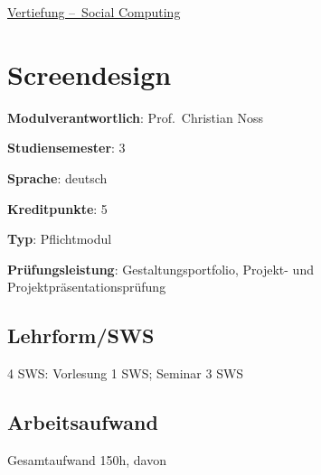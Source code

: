 \hyperref[/mi-2017/modulbeschreibungen-bachelor/BA_Vertiefung_SocialComputing]{Vertiefung – Social Computing}

\hypertarget{screendesignpathlabelmi-2017modulbeschreibungen-bachelorba_screendesign}{%
\chapter{Screendesign\label{/mi-2017/modulbeschreibungen-bachelor/BA_Screendesign}}\label{screendesignpathlabelmi-2017modulbeschreibungen-bachelorba_screendesign}}

\begin{modulHead}
\textbf{Modulverantwortlich}: Prof.~Christian
Noss
\end{modulHead}
\begin{modulHead}
\textbf{Studiensemester}:
3
\end{modulHead}
\begin{modulHead}
\textbf{Sprache}:
deutsch
\end{modulHead}
\begin{modulHead}
\textbf{Kreditpunkte}:
5
\end{modulHead}
\begin{modulHead}
\textbf{Typ}:
Pflichtmodul
\end{modulHead}
\begin{modulHead}
\textbf{Prüfungsleistung}:
Gestaltungsportfolio, Projekt- und
Projektpräsentationsprüfung
\end{modulHead}


\hypertarget{lehrformswspathlabelmi-2017modulbeschreibungen-bachelorba_screendesign}{%
\section*{Lehrform/SWS\label{/mi-2017/modulbeschreibungen-bachelor/BA_Screendesign}}\label{lehrformswspathlabelmi-2017modulbeschreibungen-bachelorba_screendesign}}

4 SWS: Vorlesung 1 SWS; Seminar 3 SWS

\hypertarget{arbeitsaufwandpathlabelmi-2017modulbeschreibungen-bachelorba_screendesign}{%
\section*{Arbeitsaufwand\label{/mi-2017/modulbeschreibungen-bachelor/BA_Screendesign}}\label{arbeitsaufwandpathlabelmi-2017modulbeschreibungen-bachelorba_screendesign}}

Gesamtaufwand 150h, davon

